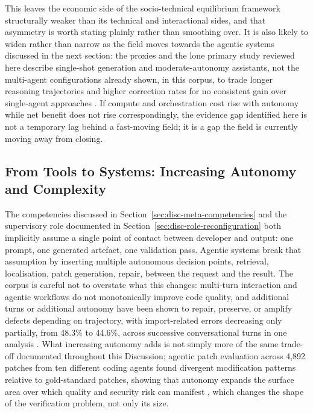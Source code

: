 This leaves the economic side of the socio-technical equilibrium framework structurally weaker than its technical and interactional sides, and that asymmetry is worth stating plainly rather than smoothing over. It is also likely to widen rather than narrow as the field moves towards the agentic systems discussed in the next section: the proxies and the lone primary study reviewed here describe single-shot generation and moderate-autonomy assistants, not the multi-agent configurations already shown, in this corpus, to trade longer reasoning trajectories and higher correction rates for no consistent gain over single-agent approaches \cite{yin_comprehensive_2025}. If compute and orchestration cost rise with autonomy while net benefit does not rise correspondingly, the evidence gap identified here is not a temporary lag behind a fast-moving field; it is a gap the field is currently moving away from closing.

\subsection{From Tools to Systems: Increasing Autonomy and Complexity}
\label{sec:disc-agentic} 
The competencies discussed in Section~\ref{sec:disc-meta-competencies} and the supervisory role documented in Section~\ref{sec:disc-role-reconfiguration} both implicitly assume a single point of contact between developer and output: one prompt, one generated artefact, one validation pass. Agentic systems break that assumption by inserting multiple autonomous decision points, retrieval, localisation, patch generation, repair, between the request and the result. The corpus is careful not to overstate what this changes: multi-turn interaction and agentic workflows do not monotonically improve code quality, and additional turns or additional autonomy have been shown to repair, preserve, or amplify defects depending on trajectory, with import-related errors decreasing only partially, from 48.3\% to 44.6\%, across successive conversational turns in one analysis \cite{zhong_developer-llm_2025}. What increasing autonomy adds is not simply more of the same trade-off documented throughout this Discussion; agentic patch evaluation across 4,892 patches from ten different coding agents found divergent modification patterns relative to gold-standard patches, showing that autonomy expands the surface area over which quality and security risk can manifest \cite{chen_evaluating_2024}, which changes the shape of the verification problem, not only its size.

